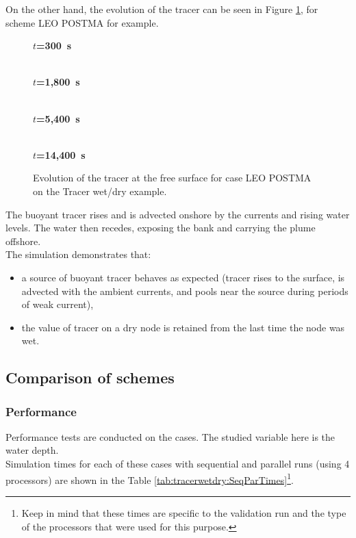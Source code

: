 On the other hand, the evolution of the tracer can be seen in Figure \ref{fig:tracerwetdry:Tracer_LEO}, for scheme LEO POSTMA for example.

\begin{figure}[H]
  \centering
  \textbf{$t$=300~s}\par\medskip
  \\
  \textbf{$t$=1,800~s}\par\medskip
  \\
  \textbf{$t$=5,400~s}\par\medskip
  \\
  \textbf{$t$=14,400~s}\par\medskip
  \caption{Evolution of the tracer at the free surface for case LEO POSTMA on the Tracer wet/dry example.}\label{fig:tracerwetdry:Tracer_LEO}
\end{figure}

The buoyant tracer rises and is advected onshore by the currents and rising water levels.
The water then recedes, exposing the bank and carrying the plume offshore. \\

The simulation demonstrates that:
\begin{itemize}
\item a source of buoyant tracer behaves as expected (tracer rises to the surface,
  is advected with the ambient currents, and pools near the source during periods of weak current),
\item the value of tracer on a dry node is retained from the last time the node was wet.
\end{itemize}

\subsection{Comparison of schemes}
\subsubsection*{Performance}
Performance tests are conducted on the cases. The studied variable here is the water depth.\\

Simulation times for each  of these cases with sequential and parallel runs
(using 4 processors) are shown in the Table \ref{tab:tracerwetdry:SeqParTimes}\footnote{Keep
in mind that these times are specific to the validation run and the type of the processors that were used for this purpose.}.

